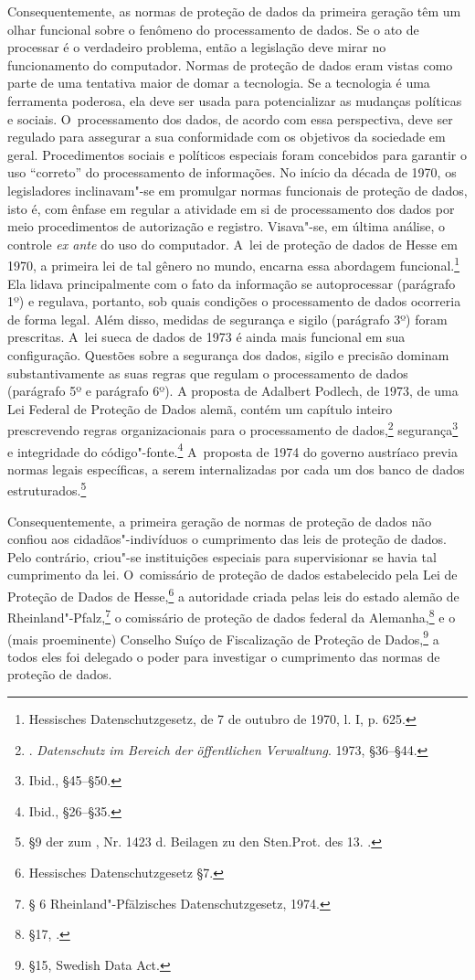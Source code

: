 Consequentemente, as normas de proteção de dados da primeira geração têm
um olhar funcional sobre o fenômeno do processamento de dados. Se o ato
de processar é o verdadeiro problema, então a legislação deve mirar no
funcionamento do computador. Normas de proteção de dados eram vistas
como parte de uma tentativa maior de domar a tecnologia. Se a tecnologia
é uma ferramenta poderosa, ela deve ser usada para potencializar as
mudanças políticas e sociais. O~processamento dos dados, de acordo com
essa perspectiva, deve ser regulado para assegurar a sua conformidade
com os objetivos da sociedade em geral. Procedimentos sociais e
políticos especiais foram concebidos para garantir o uso ``correto'' do
processamento de informações. No início da década de 1970, os
legisladores inclinavam"-se em promulgar normas funcionais de proteção de
dados, isto é, com ênfase em regular a atividade em si de processamento
dos dados por meio procedimentos de autorização e registro. Visava"-se,
em última análise, o controle \emph{ex ante} do uso do computador. A~lei
de proteção de dados de Hesse em 1970, a primeira lei de tal gênero no
mundo, encarna essa abordagem funcional.\footnote{Hessisches
  Datenschutzgesetz, de 7 de outubro de 1970, l. I, p. 625.} Ela
lidava principalmente com o fato da informação se autoprocessar
(parágrafo 1º) e regulava, portanto, sob quais condições o processamento
de dados ocorreria de forma legal. Além disso, medidas de segurança e
sigilo (parágrafo 3º) foram prescritas. A~lei sueca de dados de 1973 é
ainda mais funcional em sua configuração. Questões sobre a segurança dos
dados, sigilo e precisão dominam substantivamente as suas regras que
regulam o processamento de dados (parágrafo 5º e parágrafo 6º). A
proposta de Adalbert Podlech, de 1973, de uma Lei Federal de Proteção de
Dados alemã, contém um capítulo inteiro prescrevendo regras
organizacionais para o processamento de dados,\footnote{.
  \emph{Datenschutz im Bereich der öffentlichen Verwaltung}. 1973,
  §36--§44.} segurança\footnote{Ibid., §45--§50.} e integridade do
código"-fonte.\footnote{Ibid., §26--§35.} A~proposta de 1974 do governo
austríaco previa normas legais específicas, a serem internalizadas por
cada um dos banco de dados estruturados.\footnote{§9 der  zum , Nr.
  1423 d. Beilagen zu den Sten.Prot. des  13. .}

Consequentemente, a primeira geração de normas de proteção de dados não
confiou aos cidadãos"-indivíduos o cumprimento das leis de proteção de
dados. Pelo contrário, criou"-se instituições especiais para
supervisionar se havia tal cumprimento da lei. O~comissário de proteção
de dados estabelecido pela Lei de Proteção de Dados de Hesse,\footnote{Hessisches
  Datenschutzgesetz §7.} a autoridade criada pelas leis do estado alemão
de Rheinland"-Pfalz,\footnote{§ 6 Rheinland"-Pfälzisches
  Datenschutzgesetz, 1974.} o comissário de proteção de dados federal da
Alemanha,\footnote{§17, .} e o (mais proeminente) Conselho Suíço de
Fiscalização de Proteção de Dados,\footnote{§15, Swedish Data Act.} a
todos eles foi delegado o poder para investigar o cumprimento das normas
de proteção de dados.


